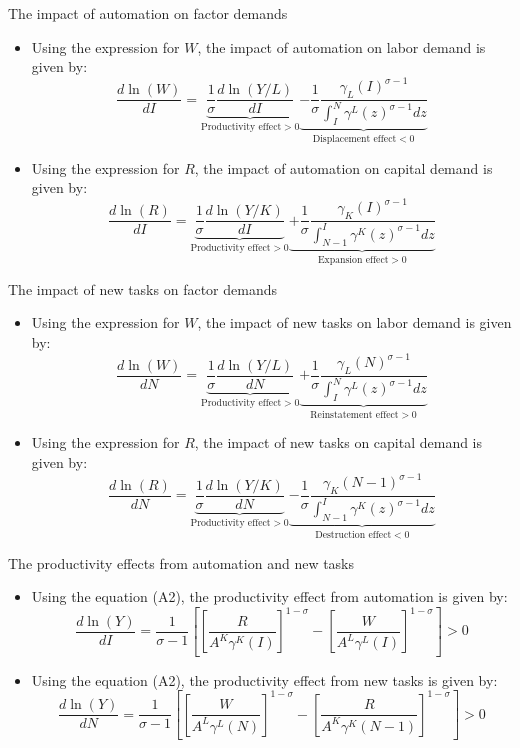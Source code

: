 \documentclass[notes=show]{beamer}
\begin{document}
\begin{frame}{The impact of automation on factor demands}
\begin{itemize}
\item Using the expression for $W$, the impact of automation on labor demand is given by:
\[
\frac{d \ln (W)}{dI} = \underbrace{\frac{1}{\sigma} \frac{d \ln (Y/L)}{dI}}_{\text{Productivity effect} >0} \underbrace{- \frac{1}{\sigma} \frac{\gamma_{L}(I)^{\sigma-1}}{\int_{I}^{N} \gamma^{L}(z)^{\sigma - 1} dz }}_{\text{Displacement effect}<0}
\]
\item Using the expression for $R$, the impact of automation on capital demand is given by:
\[
\frac{d \ln (R)}{dI} = \underbrace{\frac{1}{\sigma} \frac{d \ln (Y/K)}{dI}}_{\text{Productivity effect} >0} \underbrace{+ \frac{1}{\sigma} \frac{\gamma_{K}(I)^{\sigma-1}}{\int_{N-1}^{I} \gamma^{K}(z)^{\sigma - 1} dz }}_{\text{Expansion effect}>0}
\]
\end{itemize}
\end{frame}

\begin{frame}{The impact of new tasks on factor demands}
\begin{itemize}
\item Using the expression for $W$, the impact of new tasks on labor demand is given by:
\[
\frac{d \ln (W)}{dN} = \underbrace{\frac{1}{\sigma} \frac{d \ln (Y/L)}{dN}}_{\text{Productivity effect} >0} \underbrace{+ \frac{1}{\sigma} \frac{\gamma_{L}(N)^{\sigma-1}}{\int_{I}^{N} \gamma^{L}(z)^{\sigma - 1} dz }}_{\text{Reinstatement effect}>0}
\]
\item Using the expression for $R$, the impact of new tasks on capital demand is given by:
\[
\frac{d \ln (R)}{dN} = \underbrace{\frac{1}{\sigma} \frac{d \ln (Y/K)}{dN}}_{\text{Productivity effect} >0} \underbrace{- \frac{1}{\sigma} \frac{\gamma_{K}(N-1)^{\sigma-1}}{\int_{N-1}^{I} \gamma^{K}(z)^{\sigma - 1} dz }}_{\text{Destruction effect}<0}
\]
\end{itemize}
\end{frame}

\begin{frame}{The productivity effects from automation and new tasks}
\begin{itemize}
\item Using the equation (A2), the productivity effect from automation is given by:
\[
\frac{d \ln (Y) }{dI} = \frac{1}{\sigma -1} \left[ \left[ \frac{R}{A^{K}\gamma^{K}(I)} \right] ^{1- \sigma} - \left[ \frac{W}{A^{L} \gamma^{L}(I)} \right]^{1- \sigma} \right] > 0
\]
\item Using the equation (A2), the productivity effect from new tasks is given by:
\[
\frac{d \ln (Y) }{dN} = \frac{1}{\sigma -1} \left[ \left[ \frac{W}{A^{L} \gamma^{L}(N)} \right]^{1- \sigma} - \left[ \frac{R}{A^{K}\gamma^{K}(N-1)} \right]^{1- \sigma} \right] > 0
\]
\end{itemize}
\end{frame}
\end{document}

